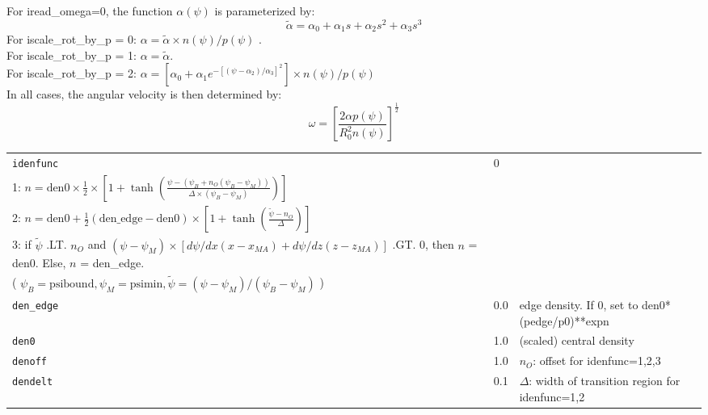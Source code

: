 For iread\_omega=0, the function $\alpha(\psi)$ is parameterized by:
 \[ \tilde{\alpha} = \alpha_{0} + \alpha_{1} s + \alpha_{2} s^{2} + \alpha_{3} s^{3} \]
For iscale\_rot\_by\_p = 0:  $\alpha = \tilde{\alpha} \times n(\psi) / p(\psi)$ . \\
For iscale\_rot\_by\_p = 1:  $\alpha = \tilde{\alpha} $. \\
For iscale\_rot\_by\_p = 2:  $\alpha = \left[ \alpha_{0} + \alpha_{1} e^{-\left[ \left( \psi - \alpha_{2} \right) / \alpha_{3} 
                                          \right]^{2} }       \right] \times n(\psi) /p(\psi) $ \\
In all cases, the angular velocity is then determined by:
\[      \omega = \left[  \frac{2 \alpha p(\psi)}{R_0^2 n(\psi)} \right]^{\frac{1}{2}} \]
\begin{tabular}{llp{4in}}
  \texttt{idenfunc}         & 0   &
  \begin{minipage}[t]{4.0in}
    0: $ n = \mbox{den0} \times (p/p0)^{\mbox{expn}} + \mbox{denedge} $ \\
    1: $ n = \mbox{den0} \times \frac{1}{2} \times 
       \left[1 + \tanh \left(\frac{\psi - (\psi_B + n_O (\psi_B - \psi_M))}
                                  {\Delta \times (\psi_B - \psi_M)        } \right)    \right] $ \\
    2: $ n = \mbox{den0} + \frac{1}{2}  \left( \mbox{den\_edge} - \mbox{den0} \right)
                  \times  \left[1 + \tanh \left( \frac{ \tilde{\psi} - n_O}
                                               {      \Delta            } \right)  \right] $\\
    3: if $\tilde{\psi}$ .LT. $n_O$ and $(\psi - \psi_M) \times \left[d \psi /dx (x - x_{MA}) + d \psi /dz (z - z_{MA} )           
                \right] $ .GT. 0, then $n$ = den0.     Else, $n$ = den\_edge.  \\
    ( $\psi_B = \mbox{psibound}, \psi_M = \mbox{psimin}, \tilde{\psi} = (\psi - \psi_M)/(\psi_B - \psi_M) $ )
  \end{minipage}    \\

  \texttt{den\_edge}        & 0.0 & edge density.  If 0, set to den0*(pedge/p0)**expn \\
  \texttt{den0}             & 1.0 & (scaled) central density\\
  \texttt{denoff}           & 1.0 & $n_O$: offset for idenfunc=1,2,3 \\
  \texttt{dendelt}          & 0.1 & $\Delta$: width of transition region for idenfunc=1,2 \\


\end{tabular}
